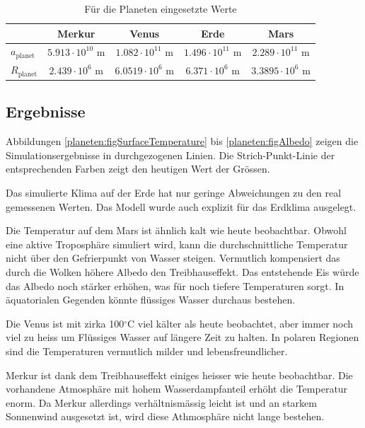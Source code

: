 \begin{refsection}
\begin{center}
\begin{table}[!h]
	\center
	\begin{tabular}{l|c c c c}
                        & Merkur                    & Venus                    & Erde                    & Mars     \\
  \hline
  $a_{\text{planet}}$   & $5.913 \cdot 10^{10}$ m   & $1.082 \cdot 10^{11}$ m  & $1.496 \cdot 10^{11}$ m & $2.289 \cdot 10^{11}$ m \\
  $R_{\text{planet}}$   & $2.439 \cdot 10^{6}$ m   & $6.0519 \cdot 10^{6}$ m  & $6.371 \cdot 10^{6}$ m  & $3.3895 \cdot 10^{6}$ m 
\end{tabular}
\caption{Für die Planeten eingesetzte Werte \cite{planeten:radius} \cite{planeten:semiMinorAxis}}
\label{planeten:planetValues}
\end{table}
\end{center}

\subsection{Ergebnisse}

	Abbildungen \ref{planeten:figSurfaceTemperature} bis \ref{planeten:figAlbedo} zeigen die Simulationsergebnisse in durchgezogenen Linien. Die Strich-Punkt-Linie der entsprechenden Farben zeigt den heutigen Wert der Grössen.
		
	Das simulierte Klima auf der Erde hat nur geringe Abweichungen zu den real gemessenen Werten. Das Modell wurde auch explizit für das Erdklima ausgelegt.
	
	Die Temperatur auf dem Mars ist ähnlich kalt wie heute beobachtbar. Obwohl eine aktive Troposphäre simuliert wird, kann die durchschnittliche Temperatur nicht über den Gefrierpunkt von Wasser steigen. Vermutlich kompensiert das durch die Wolken höhere Albedo den Treibhauseffekt. Das entstehende Eis würde das Albedo noch stärker erhöhen, was für noch tiefere Temperaturen sorgt. In äquatorialen Gegenden könnte flüssiges Wasser durchaus bestehen.
	
	Die Venus ist mit zirka 100$^\circ$C viel kälter als heute beobachtet, aber immer noch viel zu heiss um Flüssiges Wasser auf längere Zeit zu halten. In polaren Regionen sind die Temperaturen vermutlich milder und lebensfreundlicher.
	
	Merkur ist dank dem Treibhauseffekt einiges heisser wie heute beobachtbar. Die vorhandene Atmosphäre mit hohem Wasserdampfanteil erhöht die Temperatur enorm. Da Merkur allerdings verhältnismässig leicht ist und an starkem Sonnenwind ausgesetzt ist, wird diese Athmosphäre nicht lange bestehen.


\end{refsection}
